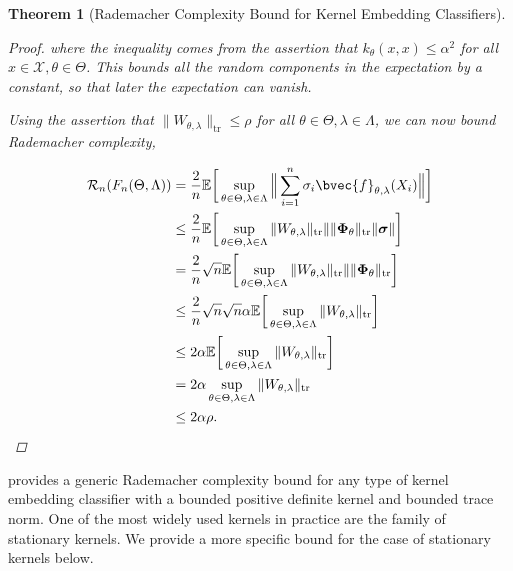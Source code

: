 \documentclass{article}
\newtheorem{theorem}{Theorem}[section]
\numberwithin{equation}{section}
\numberwithin{table}{section}
\numberwithin{algorithm}{section}
\begin{document}
\begin{theorem}[Rademacher Complexity Bound for Kernel Embedding Classifiers]
\begin{proof}
				where the inequality comes from the assertion that $k_{\theta}(x, x) \leq \alpha^{2}$ for all $x \in \mathcal{X}, \theta \in \Theta$. This bounds all the random components in the expectation by a constant, so that later the expectation can vanish. 
				
				Using the assertion that $\| W_{\theta, \lambda} \|_{\mathrm{tr}} \leq \rho$ for all $\theta \in \Theta, \lambda \in \Lambda$, we can now bound Rademacher complexity,
				
				\begin{equation}
					\begin{aligned}
						\mathcal{R}_{n}(F_{n}(\Theta, \Lambda)) &= \frac{2}{n} \mathbb{E}\bigg[\sup_{\theta \in \Theta, \lambda \in \Lambda} \Big\| \sum_{i = 1}^{n} \sigma_{i}\bvec{f}_{\theta, \lambda}(X_{i}) \Big\|\bigg] \\
						&\leq \frac{2}{n} \mathbb{E}\bigg[\sup_{\theta \in \Theta, \lambda \in \Lambda} \|  W_{\theta, \lambda} \|_{\mathrm{tr}} \| \| \bm{\Phi}_{\theta} \|_{\mathrm{tr}} \| \bm{\sigma} \| \bigg] \\
						&= \frac{2}{n} \sqrt{n} \mathbb{E}\bigg[\sup_{\theta \in \Theta, \lambda \in \Lambda} \|  W_{\theta, \lambda} \|_{\mathrm{tr}} \| \| \bm{\Phi}_{\theta} \|_{\mathrm{tr}} \bigg] \\
						&\leq \frac{2}{n} \sqrt{n} \sqrt{n} \alpha \mathbb{E}\bigg[\sup_{\theta \in \Theta, \lambda \in \Lambda} \|  W_{\theta, \lambda} \|_{\mathrm{tr}} \bigg] \\
						&\leq 2 \alpha \mathbb{E}\bigg[\sup_{\theta \in \Theta, \lambda \in \Lambda} \|  W_{\theta, \lambda} \|_{\mathrm{tr}} \bigg] \\
						&= 2 \alpha \sup_{\theta \in \Theta, \lambda \in \Lambda} \|  W_{\theta, \lambda} \|_{\mathrm{tr}} \\
						&\leq 2 \alpha \rho.
					\end{aligned}
				\end{equation}
			\end{proof}
		\end{theorem}
	
		 provides a generic Rademacher complexity bound for any type of kernel embedding classifier with a bounded positive definite kernel and bounded trace norm. One of the most widely used kernels in practice are the family of stationary kernels. We provide a more specific bound for the case of stationary kernels below.
		
\end{document}
